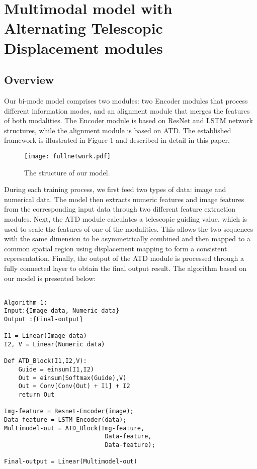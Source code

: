 \documentclass{ecai}
\begin{document}
\section{Multimodal model with Alternating Telescopic Displacement modules}

\subsection{Overview}
Our bi-mode model comprises two modules: two Encoder modules that process different information modes, and an alignment module that merges the features of both modalities. The Encoder module is based on ResNet \cite{he_deep_2016} and LSTM \cite{hochreiter_long_1997} network structures, while the alignment module is based on ATD. The established framework is illustrated in Figure 1 and described in detail in this paper.

\begin{figure}[htp]
    \centering
    \texttt{[image: fullnetwork.pdf]}
    \caption{The structure of our model. }
    \label{fig:network}
\end{figure}

During each training process, we first feed two types of data: image and numerical data. The model then extracts numeric features and image features from the corresponding input data through two different feature extraction modules. Next, the ATD module calculates a telescopic guiding value, which is used to scale the features of one of the modalities. This allows the two sequences with the same dimension to be asymmetrically combined and then mapped to a common spatial region using displacement mapping to form a consistent representation. Finally, the output of the ATD module is processed through a fully connected layer to obtain the final output result. The algorithm based on our model is presented below:
\begin{verbatim}

Algorithm 1:
Input:{Image data, Numeric data}
Output :{Final-output}

I1 = Linear(Image data)
I2, V = Linear(Numeric data)

Def ATD_Block(I1,I2,V):
    Guide = einsum(I1,I2)
    Out = einsum(Softmax(Guide),V)
    Out = Conv[Conv(Out) + I1] + I2
    return Out

Img-feature = Resnet-Encoder(image);
Data-feature = LSTM-Encoder(data);
Multimodel-out = ATD_Block(Img-feature,
                            Data-feature,
                            Data-feature);
                                    
Final-output = Linear(Multimodel-out)
    
\end{verbatim} 
\end{document}
